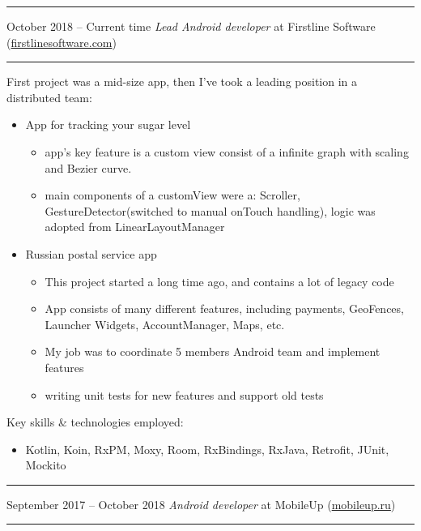 \documentclass[11pt]{article}
\newcommand\CvSmallSkipLength{0.5em}
\newcommand\CvSkip[1]{\vspace{#1}}
\newcommand\CvSmallSkip{\CvSkip{\CvSmallSkipLength}}
\newcommand\CvRule{\begingroup\color{CvRuleColor}\hrule\endgroup}
\newcommand\CvWorkplaceHeader[5]{\begingroup%
  \CvRule%
  \fboxsep0pt%
  \colorbox{CvWorkplaceHeaderColor}{%
    \begin{minipage}{\linewidth-2\fboxsep}%
\CvSmallSkip%
#1 -- #2 \hfill \textit{#3} at #4 (\href{http://#5/}{#5})%
\CvSmallSkip%
    \end{minipage}%
  }%
  \CvRule%
\endgroup%
}
\newenvironment{CvWorkplaceDescription}{%
    \begingroup\setlength\parskip{\CvSmallSkipLength}%
  }{%
    \CvSmallSkip\endgroup%
  }
\begin{document}
\CvWorkplaceHeader{October 2018}{Current time}{Lead Android developer}{Firstline Software}{firstlinesoftware.com}
\begin{CvWorkplaceDescription}
First project	 was a mid-size app, then I've took a leading position in a distributed team:
\begin{itemize}[noitemsep]
 \item App for tracking your sugar level
\begin{itemize}
\item  app's key feature is a custom view consist of a infinite graph with scaling and Bezier curve. 
 \item main components of a customView were a: Scroller, GestureDetector(switched to manual onTouch handling), logic was adopted from LinearLayoutManager
\end{itemize}
\item Russian postal service app
\begin{itemize}
\item  This project started a long time ago, and contains a lot of legacy code
\item  App consists of many different features, including payments, GeoFences, Launcher Widgets, AccountManager, Maps, etc.
 \item My job was to coordinate 5 members Android team and implement features
 \item writing unit tests for new features and support old tests
\end{itemize}
\end{itemize}

Key skills \& technologies employed:
\begin{itemize}[noitemsep]
  \item Kotlin, Koin, RxPM, Moxy, Room, RxBindings, RxJava, Retrofit, JUnit, Mockito
\end{itemize}
\end{CvWorkplaceDescription}

\CvWorkplaceHeader{September 2017}{October 2018}{Android developer}{MobileUp}{mobileup.ru}
\end{document}
